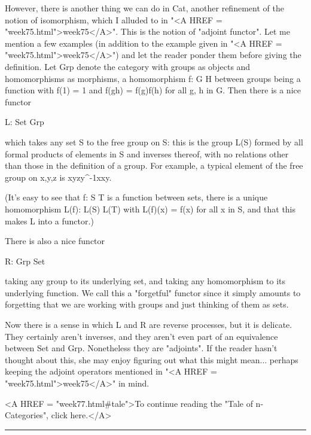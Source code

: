However, there is another thing we can do in Cat, another refinement of
the notion of isomorphism, which I alluded to in "<A HREF =
"week75.html">week75</A>".  This is the notion of "adjoint
functor".  Let me mention a few examples (in addition to the
example given in "<A HREF = "week75.html">week75</A>") and let
the reader ponder them before giving the definition.  Let Grp denote the
category with groups as objects and homomorphisms as morphisms, a
homomorphism f: G \to  H between groups being a function with f(1) = 1
and f(gh) = f(g)f(h) for all g, h in G.  Then there is a nice functor

                        L: Set \to  Grp

which takes any set S to the free group on S: this is the group L(S) formed
by all formal products of elements in S and inverses thereof, with no
relations other than those in the definition of a group.  For
example, a typical element of the free group on {x,y,z} is
xyzy^{-1}xxy.  

(It's easy to see that f: S \to  T is a function between sets, there is a
unique homomorphism L(f): L(S) \to  L(T) with L(f)(x) = f(x) for all x in
S, and that this makes L into a functor.)

There is also a nice functor

                        R: Grp \to  Set

taking any group to its underlying set, and taking any homomorphism to
its underlying function.  We call this a "forgetful" functor since it
simply amounts to forgetting that we are working with groups and just
thinking of them as sets.  

Now there is a sense in which L and R are reverse processes, but it is
delicate.  They certainly aren't inverses, and they aren't even part of
an equivalence between Set and Grp.  Nonetheless they are "adjoints".
If the reader hasn't thought about this, she may enjoy figuring out what
this might mean... perhaps keeping the adjoint operators mentioned in
"<A HREF = "week75.html">week75</A>" in mind.

<A HREF = "week77.html#tale">To continue reading the "Tale of
n-Categories", click here.</A>


\par\noindent\rule{\textwidth}{0.4pt}
